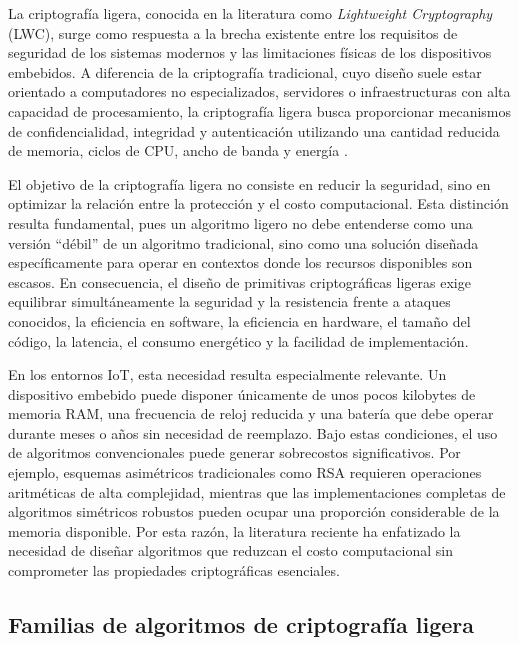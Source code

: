 La criptografía ligera, conocida en la literatura como \textit{Lightweight Cryptography} (LWC), surge como respuesta a la brecha existente entre los requisitos de seguridad de los sistemas modernos y las limitaciones físicas de los dispositivos embebidos. A diferencia de la criptografía tradicional, cuyo diseño suele estar orientado a computadores no especializados, servidores o infraestructuras con alta capacidad de procesamiento, la criptografía ligera busca proporcionar mecanismos de confidencialidad, integridad y autenticación utilizando una cantidad reducida de memoria, ciclos de CPU, ancho de banda y energía \cite{McKay2017ReportCryptography,Althobaiti2025LightweightStandardization,Thakor2021LightweightOpportunities}.

El objetivo de la criptografía ligera no consiste en reducir la seguridad, sino en optimizar la relación entre la protección y el costo computacional. Esta distinción resulta fundamental, pues un algoritmo ligero no debe entenderse como una versión ``débil'' de un algoritmo tradicional, sino como una solución diseñada específicamente para operar en contextos donde los recursos disponibles son escasos. En consecuencia, el diseño de primitivas criptográficas ligeras exige equilibrar simultáneamente la seguridad y la resistencia frente a ataques conocidos, la eficiencia en software, la eficiencia en hardware, el tamaño del código, la latencia, el consumo energético y la facilidad de implementación.

En los entornos IoT, esta necesidad resulta especialmente relevante. Un dispositivo embebido puede disponer únicamente de unos pocos kilobytes de memoria RAM, una frecuencia de reloj reducida y una batería que debe operar durante meses o años sin necesidad de reemplazo. Bajo estas condiciones, el uso de algoritmos convencionales puede generar sobrecostos significativos. Por ejemplo, esquemas asimétricos tradicionales como RSA requieren operaciones aritméticas de alta complejidad, mientras que las implementaciones completas de algoritmos simétricos robustos pueden ocupar una proporción considerable de la memoria disponible. Por esta razón, la literatura reciente ha enfatizado la necesidad de diseñar algoritmos que reduzcan el costo computacional sin comprometer las propiedades criptográficas esenciales.

\subsection{Familias de algoritmos de criptografía ligera}

